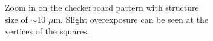 \begin{figure}[ht]
    \begin{subfigure}[t]{0.3\linewidth}
	\centering
	\caption{Zoom in on the checkerboard pattern with structure size of $\sim$10 $\mu$m. Slight overexposure can be seen at the vertices of the squares.}
	\label{fig:b2d7_q7}
\end{subfigure}
\\
\vspace*{1.5mm}
    \begin{subfigure}[t]{0.3\linewidth}
	\centering

\end{subfigure}
\end{figure}

